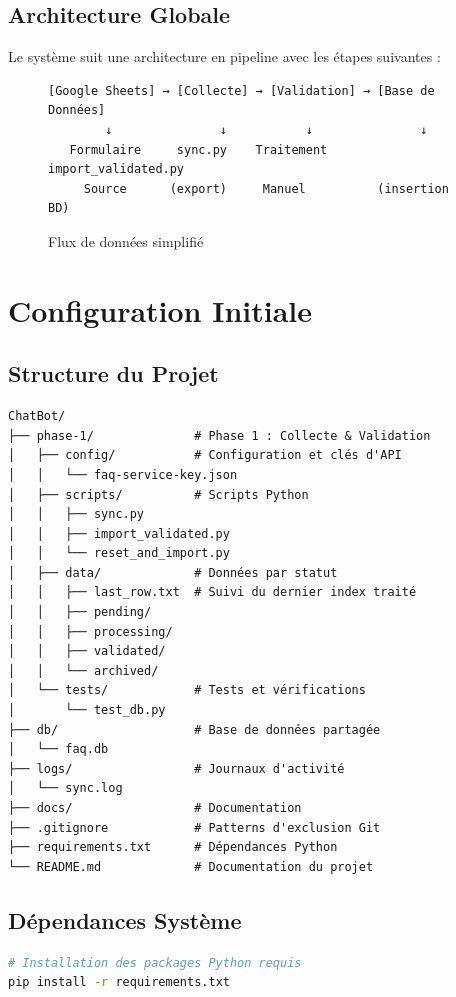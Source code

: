 \documentclass[11pt,a4paper]{article}
\begin{document}
\subsection{Architecture Globale}
Le système suit une architecture en pipeline avec les étapes suivantes :

\begin{figure}[H]
    \centering
    \begin{minipage}{0.9\textwidth}
\begin{lstlisting}
[Google Sheets] → [Collecte] → [Validation] → [Base de Données]
        ↓               ↓           ↓               ↓
   Formulaire     sync.py    Traitement     import_validated.py
     Source      (export)     Manuel          (insertion BD)
\end{lstlisting}
    \end{minipage}
    \caption{Flux de données simplifié}
\end{figure}

\section{Configuration Initiale}
\label{sec:initial-config}

\subsection{Structure du Projet}
\begin{lstlisting}
ChatBot/
├── phase-1/              # Phase 1 : Collecte & Validation
│   ├── config/           # Configuration et clés d'API
│   │   └── faq-service-key.json
│   ├── scripts/          # Scripts Python
│   │   ├── sync.py
│   │   ├── import_validated.py
│   │   └── reset_and_import.py
│   ├── data/             # Données par statut
│   │   ├── last_row.txt  # Suivi du dernier index traité
│   │   ├── pending/
│   │   ├── processing/
│   │   ├── validated/
│   │   └── archived/
│   └── tests/            # Tests et vérifications
│       └── test_db.py
├── db/                   # Base de données partagée
│   └── faq.db
├── logs/                 # Journaux d'activité
│   └── sync.log
├── docs/                 # Documentation
├── .gitignore            # Patterns d'exclusion Git
├── requirements.txt      # Dépendances Python
└── README.md             # Documentation du projet
\end{lstlisting}

\subsection{Dépendances Système}
\begin{lstlisting}[language=bash]
# Installation des packages Python requis
pip install -r requirements.txt
\end{lstlisting}
\end{document}
